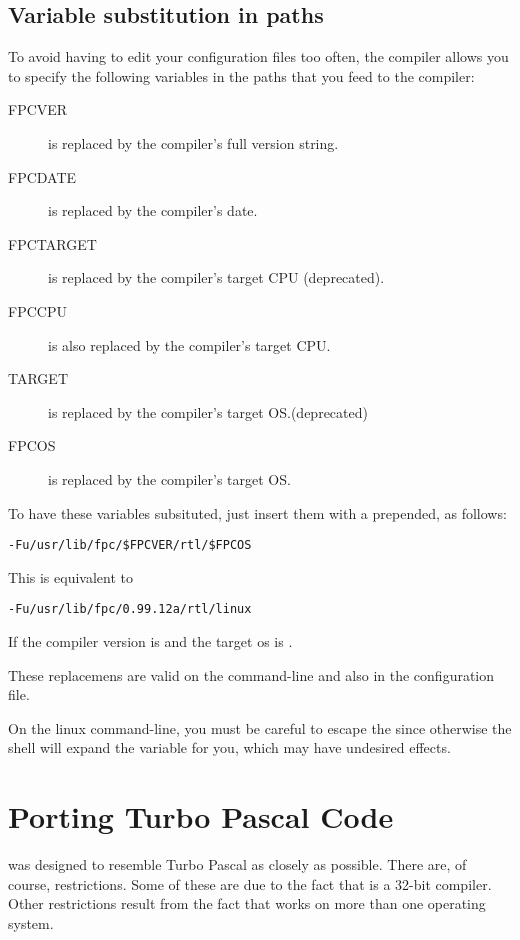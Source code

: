 \documentclass{report}
\begin{document}
\section{Variable substitution in paths}
To avoid having to edit your configuration files too often,
the compiler allows you to specify the following variables in
the paths that you feed to the compiler:
\begin{description}
\item[FPCVER] is replaced by the compiler's full version string.
\item[FPCDATE] is replaced by the compiler's date.
\item[FPCTARGET] is replaced by the compiler's target CPU
(deprecated).
\item[FPCCPU] is also replaced by the compiler's target CPU.
\item[TARGET] is replaced by the compiler's target OS.(deprecated)
\item[FPCOS] is replaced by the compiler's target OS.
\end{description}
To have these variables subsituted, just insert them with a \var{\$}
prepended, as follows:
\begin{verbatim}
-Fu/usr/lib/fpc/$FPCVER/rtl/$FPCOS
\end{verbatim}
This is equivalent to
\begin{verbatim}
-Fu/usr/lib/fpc/0.99.12a/rtl/linux
\end{verbatim}
If the compiler version is  and the target os is .

These replacemens are valid on the command-line and also in the
configuration file.

On the linux command-line, you must be careful to escape the \var{\$} since
otherwise the shell will expand the variable for you, which may have
undesired effects.


\chapter{Porting Turbo Pascal Code}

\fpc was designed to resemble Turbo Pascal as closely as possible. There
are, of course, restrictions. Some of these are due to the fact that \fpc is
a 32-bit compiler. Other restrictions result from the fact that \fpc works
on more than one operating system.
\end{document}
